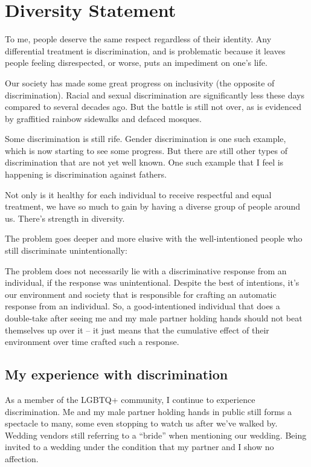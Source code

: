 \documentclass[]{book}
\begin{document}
\hypertarget{diversity-statement}{%
\chapter{Diversity Statement}\label{diversity-statement}}

To me, people deserve the same respect regardless of their identity. Any differential treatment is discrimination, and is problematic because it leaves people feeling disrespected, or worse, puts an impediment on one's life.

Our society has made some great progress on inclusivity (the opposite of discrimination). Racial and sexual discrimination are significantly less these days compared to several decades ago. But the battle is still not over, as is evidenced by graffitied rainbow sidewalks and defaced mosques.

Some discrimination is still rife. Gender discrimination is one such example, which is now starting to see some progress. But there are still other types of discrimination that are not yet well known. One such example that I feel is happening is discrimination against fathers.

Not only is it healthy for each individual to receive respectful and equal treatment, we have so much to gain by having a diverse group of people around us. There's strength in diversity.

The problem goes deeper and more elusive with the well-intentioned people who still discriminate unintentionally:

The problem does not necessarily lie with a discriminative response from an individual, if the response was unintentional. Despite the best of intentions, it's our environment and society that is responsible for crafting an automatic response from an individual. So, a good-intentioned individual that does a double-take after seeing me and my male partner holding hands should not beat themselves up over it -- it just means that the cumulative effect of their environment over time crafted such a response.

\hypertarget{my-experience-with-discrimination}{%
\section{My experience with discrimination}\label{my-experience-with-discrimination}}

As a member of the LGBTQ+ community, I continue to experience discrimination. Me and my male partner holding hands in public still forms a spectacle to many, some even stopping to watch us after we've walked by. Wedding vendors still referring to a ``bride'' when mentioning our wedding. Being invited to a wedding under the condition that my partner and I show no affection.
\end{document}
